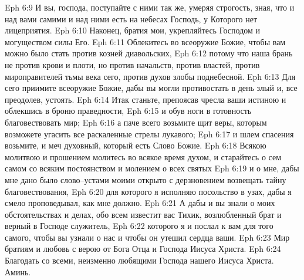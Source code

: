 Eph 6:9  И вы, господа, поступайте с ними так же, умеряя строгость, зная, что и над вами самими и над ними есть на небесах Господь, у Которого нет лицеприятия.
Eph 6:10  Наконец, братия мои, укрепляйтесь Господом и могуществом силы Его.
Eph 6:11  Облекитесь во всеоружие Божие, чтобы вам можно было стать против козней диавольских,
Eph 6:12  потому что наша брань не против крови и плоти, но против начальств, против властей, против мироправителей тьмы века сего, против духов злобы поднебесной.
Eph 6:13  Для сего приимите всеоружие Божие, дабы вы могли противостать в день злый и, все преодолев, устоять.
Eph 6:14  Итак станьте, препоясав чресла ваши истиною и облекшись в броню праведности,
Eph 6:15  и обув ноги в готовность благовествовать мир;
Eph 6:16  а паче всего возьмите щит веры, которым возможете угасить все раскаленные стрелы лукавого;
Eph 6:17  и шлем спасения возьмите, и меч духовный, который есть Слово Божие.
Eph 6:18  Всякою молитвою и прошением молитесь во всякое время духом, и старайтесь о сем самом со всяким постоянством и молением о всех святых
Eph 6:19  и о мне, дабы мне дано было слово--устами моими открыто с дерзновением возвещать тайну благовествования,
Eph 6:20  для которого я исполняю посольство в узах, дабы я смело проповедывал, как мне должно.
Eph 6:21  А дабы и вы знали о моих обстоятельствах и делах, обо всем известит вас Тихик, возлюбленный брат и верный в Господе служитель,
Eph 6:22  которого я и послал к вам для того самого, чтобы вы узнали о нас и чтобы он утешил сердца ваши.
Eph 6:23  Мир братиям и любовь с верою от Бога Отца и Господа Иисуса Христа.
Eph 6:24  Благодать со всеми, неизменно любящими Господа нашего Иисуса Христа. Аминь.


